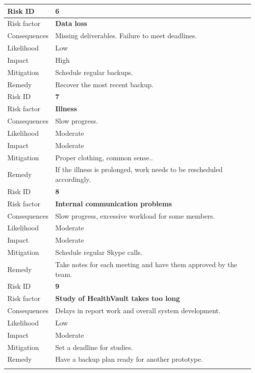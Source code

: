 \begin{table}[h]
\begin{tabular}{ | l | p{11.5cm} | }
  \hline

  Risk ID & \textbf{6} \\
  \hline\noalign{\smallskip}\hline
  Risk factor   & \textbf{Data loss} \\
  Consequences  & Missing deliverables. Failure to meet deadlines. \\
  Likelihood    & Low \\
  Impact        & High \\
  Mitigation    & Schedule regular backups. \\
  Remedy        & Recover the most recent backup. \\
  \hline\noalign{\smallskip}\noalign{\smallskip}\hline
  
  Risk ID & \textbf{7} \\
  \hline\noalign{\smallskip}\hline
  Risk factor   & \textbf{Illness} \\
  Consequences  & Slow progress. \\
  Likelihood    & Moderate \\
  Impact        & Moderate \\
  Mitigation    & Proper clothing, common sense.. \\
  Remedy        & If the illness is prolonged, work needs to be rescheduled accordingly. \\
  \hline\noalign{\smallskip}\noalign{\smallskip}\hline
  
  Risk ID & \textbf{8} \\
  \hline\noalign{\smallskip}\hline
  Risk factor   & \textbf{Internal communication problems} \\
  Consequences  & Slow progress, excessive workload for some members. \\
  Likelihood    & Moderate \\
  Impact        & Moderate \\
  Mitigation    & Schedule regular Skype calls. \\
  Remedy        & Take notes for each meeting and have them approved by the team. \\
  \hline\noalign{\smallskip}\noalign{\smallskip}\hline

  Risk ID & \textbf{9} \\
  \hline\noalign{\smallskip}\hline
  Risk factor   & \textbf{Study of HealthVault takes too long} \\
  Consequences  & Delays in report work and overall system development. \\
  Likelihood    & Low \\
  Impact        & Moderate \\
  Mitigation    & Set a deadline for studies. \\
  Remedy        & Have a backup plan ready for another prototype. \\
  \hline\noalign{\smallskip}\noalign{\smallskip}\hline


\end{tabular}
\end{table}
